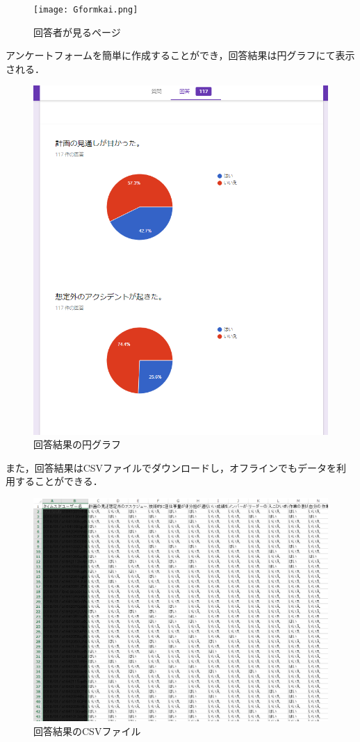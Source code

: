 \begin{figure}[!htbp]
\centering 
\texttt{[image: Gformkai.png]}
\caption{回答者が見るページ}
\end{figure}
\newpage
アンケートフォームを簡単に作成することができ，回答結果は円グラフにて表示される．
\begin{figure}[!htbp]
\centering 
\includegraphics[width=13cm]{Gforman.png}
\caption{回答結果の円グラフ}
\end{figure}
\newpage
また，回答結果はCSVファイルでダウンロードし，オフラインでもデータを利用することができる．
\begin{figure}[!htbp]
\centering 
\includegraphics[width=13cm]{GFcs.png}
\caption{回答結果のCSVファイル}
\end{figure}
\newpage

